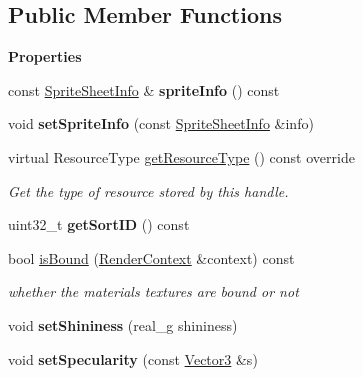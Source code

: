 \subsection*{Public Member Functions}
\begin{Indent}\textbf{ Properties}\par
\begin{DoxyCompactItemize}
\item 
\mbox{\label{classrev_1_1_material_a26d7529a2060a74cf92e7629eb6cffb9}} 
const \mbox{\hyperlink{structrev_1_1_sprite_sheet_info}{Sprite\+Sheet\+Info}} \& {\bfseries sprite\+Info} () const
\item 
\mbox{\label{classrev_1_1_material_afe0975d9f4a071c8593128c0a1884bdb}} 
void {\bfseries set\+Sprite\+Info} (const \mbox{\hyperlink{structrev_1_1_sprite_sheet_info}{Sprite\+Sheet\+Info}} \&info)
\item 
\mbox{\label{classrev_1_1_material_ad75df0e3377d7cd59e57d6b8c08c550a}} 
virtual Resource\+Type \mbox{\hyperlink{classrev_1_1_material_ad75df0e3377d7cd59e57d6b8c08c550a}{get\+Resource\+Type}} () const override
\begin{DoxyCompactList}\small\item\em Get the type of resource stored by this handle. \end{DoxyCompactList}\item 
\mbox{\label{classrev_1_1_material_adf0dd6185ac814c6c12590a250a6847d}} 
uint32\+\_\+t {\bfseries get\+Sort\+ID} () const
\item 
\mbox{\label{classrev_1_1_material_ac010383d1da816d7c1ed65c3bb3f3ddb}} 
bool \mbox{\hyperlink{classrev_1_1_material_ac010383d1da816d7c1ed65c3bb3f3ddb}{is\+Bound}} (\mbox{\hyperlink{classrev_1_1_render_context}{Render\+Context}} \&context) const
\begin{DoxyCompactList}\small\item\em whether the material\textquotesingle{}s textures are bound or not \end{DoxyCompactList}\item 
\mbox{\label{classrev_1_1_material_aa4e2c62ff3f480028c6d617f24378880}} 
void {\bfseries set\+Shininess} (real\+\_\+g shininess)
\item 
\mbox{\label{classrev_1_1_material_a1f446f53b0b2237cdf0ef39720585bb0}} 
void {\bfseries set\+Specularity} (const \mbox{\hyperlink{classrev_1_1_vector}{Vector3}} \&s)
\end{DoxyCompactItemize}
\end{Indent}

